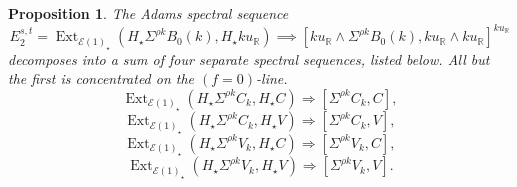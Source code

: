 \documentclass[10pt,a4paper]{amsart}
\newtheorem{proposition}{Proposition}
\DeclareMathOperator{\Ext}{Ext}
\newcommand{\cE}{{\mathcal E}}
\newcommand{\mR}{{\mathbb R}}
\begin{document}
\begin{proposition} \label{prop:splitInto4}
   The Adams spectral sequence  
\[
 E_2^{s, t} = \Ext_{\mathcal{E}(1)_\star} \left(H_\star \Sigma^{\rho k} B_0(k), H_\star ku_\mR \right) \implies [ku_\mR \wedge \Sigma^{\rho k} B_{0} (k),ku_\mR \wedge ku_\mR]^{ku_\mR}
\]decomposes into a sum of four separate spectral sequences, listed below. All but the first is concentrated on the $(f=0)$-line.
\[ \Ext_{\cE(1)_{\star}}(H_{\star}\Sigma^{\rho k}C_{k}, H_{\star}C) \Longrightarrow [\Sigma^{\rho k}C_{k}, C], \]
\[ \Ext_{\cE(1)_{\star}}(H_{\star}\Sigma^{\rho k}C_{k}, H_{\star}V) \Longrightarrow [\Sigma^{\rho k}C_{k}, V], \]
\[ \Ext_{\cE(1)_{\star}}(H_{\star}\Sigma^{\rho k}V_{k}, H_{\star}C) \Longrightarrow [\Sigma^{\rho k}V_{k}, C], \]
\[ \Ext_{\cE(1)_{\star}}(H_{\star}\Sigma^{\rho k}V_{k}, H_{\star}V) \Longrightarrow [\Sigma^{\rho k}V_{k}, V] .\]
\end{proposition}
\end{document}
